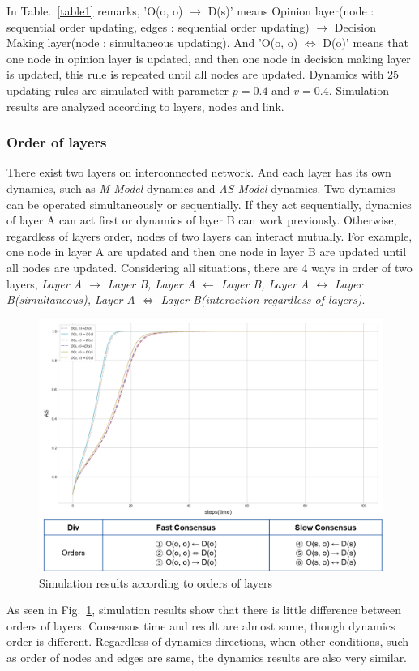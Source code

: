 \documentclass[review]{elsarticle}
\begin{document}
In Table.~\ref{table1} remarks, 'O(o, o) $\to$ D(s)’ means Opinion layer(node : sequential order updating, edges : sequential order updating) $\to$ Decision Making layer(node : simultaneous updating). And 'O(o, o) $\Leftrightarrow$ D(o)’ means that one node in opinion layer is updated, and then one node in decision making layer is updated, this rule is repeated until all nodes are updated. Dynamics with 25 updating rules are simulated with parameter $p=0.4$ and $v=0.4$. Simulation results are analyzed according to layers, nodes and link. 
 
\subsubsection{Order of layers}
There exist two layers on interconnected network. And each layer has its own dynamics, such as \textit{M-Model} dynamics and \textit{AS-Model} dynamics. Two dynamics can be operated simultaneously or sequentially. If they act sequentially, dynamics of layer A can act first or dynamics of layer B can work previously. Otherwise, regardless of layers order, nodes of two layers can interact mutually. For example, one node in layer A are updated and then one node in layer B are updated until all nodes are updated.  
Considering all situations, there are 4 ways in order of two layers, \textit{Layer A $\to$ Layer B, Layer A $\leftarrow$ Layer B, Layer A $\leftrightarrow$ Layer B(simultaneous), Layer A $\Leftrightarrow$ Layer B(interaction regardless of layers)}. 
\begin{figure}[!htb]
	\centering
	\includegraphics[width=\hsize]{layerorder.png}
	\caption{Simulation results according to orders of layers}
	\label{layerorder}
\end{figure}
As seen in Fig.~\ref{layerorder}, simulation results show that there is little difference between orders of layers. Consensus time and result are almost same, though dynamics order is different. Regardless of dynamics directions, when other conditions, such as order of nodes and edges are same, the dynamics results are also very similar.  
\end{document}
